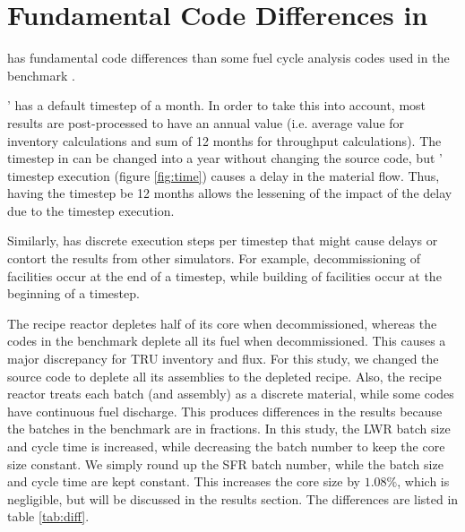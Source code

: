 
\section{Fundamental Code Differences in \Cyclus}

\Cyclus has fundamental code differences than some fuel cycle analysis codes
used in the benchmark \cite{feng_standardized_2016}.

\Cyclus' has a default timestep of a month. In order to take
this into account, most results are post-processed
to have an annual value (i.e. average value for
inventory calculations and sum of 12 months for
throughput calculations). The timestep in \Cyclus
can be changed into a year without changing the source
code, but \Cyclus' timestep execution (figure \ref{fig:time}) causes a delay
in the material flow. Thus, having the timestep be 12 months
allows the lessening of the impact of the delay due to the
\Cyclus timestep execution.

Similarly, \Cyclus has discrete
execution steps per timestep that might cause delays or contort
the results from other simulators. For example, decommissioning of
facilities occur at the end of a timestep, while building of facilities
occur at the beginning of a timestep.

The \Cycamore recipe reactor depletes half of its core when decommissioned,
whereas the codes in the benchmark \cite{feng_standardized_2016} deplete all its fuel when decommissioned. This causes a major
discrepancy for \gls{TRU} inventory and flux. For this study, we changed
the \Cycamore source code to deplete all its assemblies to the depleted recipe.
Also, the \Cycamore recipe reactor treats each batch (and assembly) as a discrete
material, while some codes have continuous fuel discharge. This produces
differences in the results because the batches in the benchmark \cite{feng_standardized_2016} are in fractions.
In this study, the \gls{LWR} batch size and cycle time is increased, while
decreasing the batch number to keep the core size constant. We simply round
up the \gls{SFR} batch number, while the batch size and cycle time are kept constant.
This increases the core size by $1.08 \%$, which is negligible, but will be
discussed in the results section.
The differences are listed in table \ref{tab:diff}.


